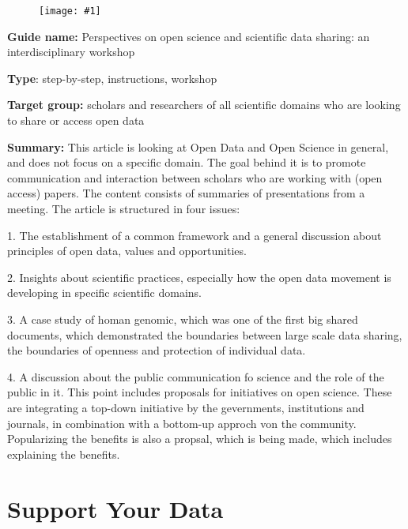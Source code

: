 \documentclass{article}
\newlength{\imgwidth}
\newcommand\scaledgraphics[2]{%
                
\settowidth{\imgwidth}{\texttt{[image: \#1]}}%
                
\setlength{\imgwidth}{\minof{\imgwidth}{#2\textwidth}}%
                
\texttt{[image: \#1]}%
                
}
\begin{document}
\begin{center}
\begin{figure}
\scaledgraphics{6ab89e0c-e542-4afd-b586-eabe59773bc0.jpg}{0.5}
\label{F43484161}
\end{figure}


\end{center}





\textbf{Guide name:}  Perspectives on open science and scientific data sharing: an interdisciplinary workshop \autocite{destro_bisol_perspectives_2014}


\textbf{Type}: step-by-step, instructions, workshop


\textbf{Target group:} scholars and researchers of all scientific domains who are looking to share or access open data


\textbf{Summary:} This article is looking at Open Data and Open Science in general, and does not focus on a specific domain. The goal behind it is to promote communication and interaction between scholars who are working with (open access) papers. The content consists of summaries of presentations from a meeting. The article is structured in four issues:


1. The establishment of a common framework and a general discussion about principles of open data, values and opportunities.


2. Insights about scientific practices, especially how the open data movement is developing in specific scientific domains.


3. A case study of homan genomic, which was one of the first big shared documents, which demonstrated the boundaries between large scale data sharing, the boundaries of openness and protection of individual data.


4. A discussion about the public communication fo science and the role of the public in it. This point includes proposals for initiatives on open science. These are integrating a top-down initiative by the gevernments, institutions and journals, in combination with a bottom-up approch von the community. Popularizing the benefits is also a propsal, which is being made, which includes explaining the benefits.


\section{Support Your Data}\label{H2541051}
\end{document}
